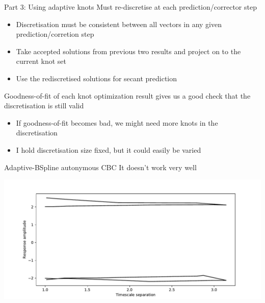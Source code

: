 \documentclass[presentation]{beamer}
\begin{document}
\begin{frame}[label={sec:orgff425d2}]{Part 3: Using adaptive knots}
Must re-discretise at each prediction/corrector step
\vfill
\begin{itemize}
\item Discretisation must be consistent between all vectors in any given prediction/corretion step
\item Take accepted solutions from previous two results and project on to the current knot set
\item Use the rediscretised solutions for secant prediction
\end{itemize}
\vfill
Goodness-of-fit of each knot optimization result gives us a good check that the discretisation is still valid
\begin{itemize}
\item If goodness-of-fit becomes bad, we might need more knots in the discretisation
\item I hold discretisation size fixed, but it could easily be varied
\end{itemize}
\end{frame}

\begin{frame}[label={sec:orga99fd13}]{Adaptive-BSpline autonymous CBC}
It doesn't work very well

\begin{center}
\includegraphics[width=.9\linewidth]{./fail.pdf}
\end{center}
\end{frame}
\end{document}

